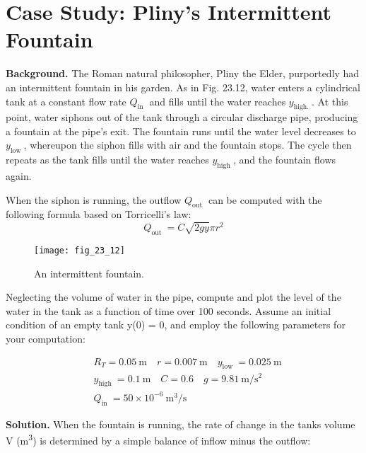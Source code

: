 \documentclass[../main.tex]{subfiles}
\begin{document}
\section{ Case Study: Pliny's Intermittent Fountain}


\noindent \textbf{Background.} The Roman natural philosopher, Pliny the Elder, purportedly had an intermittent fountain in his garden. As in Fig. 23.12, water enters a cylindrical tank at a constant flow rate $Q_{\text {in }}$ and fills until the water reaches $y_{\text {high. }}$. At this point, water siphons out of the tank through a circular discharge pipe, producing a fountain at the pipe's exit.
The fountain runs until the water level decreases to $y_{\text {low }}$, whereupon the siphon fills with air and the fountain stops. The cycle then repeats as the tank fills until the water reaches $y_{\text {high }}$, and the fountain flows again.

When the siphon is running, the outflow $Q_{\text {out }}$ can be computed with the following formula based on Torricelli's law:
\begin{equation}
    \tag{23.28}
    Q_{\text {out }}=C \sqrt{2 g y} \pi r^{2}
\end{equation}

\begin{figure}[H]
    \centering
    \texttt{[image: fig\_23\_12]}
   \caption{\textsf{An intermittent fountain.}}\label{fig:fig_23_12}
\end{figure}

\noindent Neglecting the volume of water in the pipe, compute and plot the level of the water in the
tank as a function of time over 100 seconds. Assume an initial condition of an empty tank
y(0) = 0, and employ the following parameters for your computation:

\begin{equation}
    \nonumber
    \begin{aligned}
    &R_{T}=0.05 \mathrm{~m} \quad r=0.007 \mathrm{~m} \quad y_{\text {low }}=0.025 \mathrm{~m}\\
    &y_{\text {high }}=0.1 \mathrm{~m} \quad C=0.6 \quad g=9.81 \mathrm{~m} / \mathrm{s}^{2}\\
    &Q_{\text {in }}=50 \times 10^{-6} \mathrm{~m}^{3} / \mathrm{s}
    \end{aligned}
\end{equation}

\noindent \textbf{Solution.} When the fountain is running, the rate of change in the tanks volume V (m\textsuperscript{3}) is determined by a simple balance of inflow minus the outflow:
\end{document}
